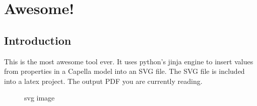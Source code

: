 \documentclass[11pt,a4paper]{report}
\title{\VAR{title}}
\author{\VAR{author}}
\begin{document}
\maketitle

\chapter{Awesome!}
\section{Introduction}
This is the most awesome tool ever. It uses python's jinja engine to insert
values from properties in a Capella model into an SVG file. The SVG file is
included into a latex project. The output PDF you are currently reading.

\begin{figure}[htbp]
  \centering
  
  \caption{svg image}
\end{figure}
\end{document}

